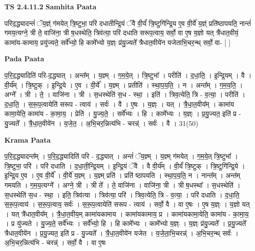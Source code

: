 \documentclass[17pt]{extarticle}
\begin{document}
\textbf{TS 2.4.11.2 } \newline
\textbf{Samhita Paata} \newline

परिद॒द्ध्यादन्तं॑ ॅय॒ज्ञ्ं ग॑मयेत् त्रि॒ष्टुभा॒ परि॑ दधातीन्द्रि॒यं ॅवै वी॒र्यं॑ त्रि॒ष्टुगि॑न्द्रि॒य ए॒व वी॒र्ये॑ य॒ज्ञ्ं प्रति॑ष्ठापयति॒ नान्तं॑ गमय॒त्यग्ने॒ त्री ते॒ वाजि॑ना॒ त्री ष॒धस्थेति॒ त्रिव॑त्या॒ परि॑ दधाति सरूप॒त्वाय॒ सर्वो॒ वा ए॒ष य॒ज्ञो यत् त्रै॑धात॒वीयं॒ कामा॑य-कामाय॒ प्रयु॑ज्यते॒ सर्वे᳚भ्यो॒ हि कामे᳚भ्यो य॒ज्ञ्ः प्र॑यु॒ज्यते᳚ त्रैधात॒वीये॑न यजेताभि॒चर॒न्थ् सर्वो॒ वा- [  ] \newline

\textbf{Pada Paata} \newline

प॒रि॒द॒द्ध्यादिति॑ परि-द॒द्ध्यात् । अन्त᳚म् । य॒ज्ञ्म् । ग॒म॒ये॒त् । त्रि॒ष्टुभा᳚ । परीति॑ । द॒धा॒ति॒ । इ॒न्द्रि॒यम् । वै । वी॒र्य᳚म् । त्रि॒ष्टुक् । इ॒न्द्रि॒ये । ए॒व । वी॒र्ये᳚ । य॒ज्ञ्म् । प्रतीति॑ । स्था॒प॒य॒ति॒ । न । अन्त᳚म् । ग॒म॒य॒ति॒ । अग्ने᳚ । त्री । ते॒ । वाजि॑ना । त्री । स॒धस्थेति॑ स॒ध - स्था॒ । इति॑ । त्रिव॒त्येति॒ त्रि - व॒त्या॒ । परीति॑ । द॒धा॒ति॒ । स॒रू॒प॒त्वायेति॑ सरूप - त्वाय॑ । सर्वः॑ । वै । ए॒षः । य॒ज्ञ्ः । यत् । त्रै॒धा॒त॒वीय᳚म् । कामा॑य कामा॒येति॒ कामा॑य - का॒मा॒य॒ । प्रेति॑ । यु॒ज्य॒ते॒ । सर्वे᳚भ्यः । हि । कामे᳚भ्यः । य॒ज्ञ्ः । प्र॒यु॒ज्यत॒ इति॑ प्र - यु॒ज्यते᳚ । त्रै॒धा॒त॒वीये॑न । य॒जे॒त॒ । अ॒भि॒चर॒न्नित्य॑भि - चरन्न्॑ । सर्वः॑ । वै । 31(50)  \newline


\textbf{Krama Paata} \newline

प॒रि॒द॒द्ध्यादन्त᳚म् । प॒रि॒द॒द्ध्यादिति॑ परि - द॒द्ध्यात् । अन्तं॑ ॅय॒ज्ञ्म् । य॒ज्ञ्म् ग॑मयेत् । ग॒म॒ये॒त् त्रि॒ष्टुभा᳚ । त्रि॒ष्टुभा॒ परि॑ । परि॑ दधाति । द॒धा॒ती॒न्द्रि॒यम् । इ॒न्द्रि॒यं ॅवै । वै वी॒र्य᳚म् । वी॒र्यं॑ त्रि॒ष्टुक् । त्रि॒ष्टुगि॑न्द्रि॒ये । इ॒न्द्रि॒य ए॒व । ए॒व वी॒र्ये᳚ । वी॒र्ये॑ य॒ज्ञ्म् । य॒ज्ञ्म् प्रति॑ । प्रति॑ ष्ठापयति । स्था॒प॒य॒ति॒ न । नान्त᳚म् । अन्त॑म् गमयति । ग॒म॒य॒त्यग्ने᳚ । अग्ने॒ त्री । त्री ते᳚ । ते॒ वाजि॑ना । वाजि॑ना॒ त्री । त्री ष॒धस्था᳚ । स॒धस्थेति॑ । स॒धस्थेति॑ स॒ध - स्था॒ । इति॒ त्रिव॑त्या । त्रिव॑त्या॒ परि॑ । त्रिव॒त्येति॒ त्रि - व॒त्या॒ । परि॑ दधाति । द॒धा॒ति॒ स॒रू॒प॒त्वाय॑ । स॒रू॒प॒त्वाय॒ सर्वः॑ । स॒रू॒प॒त्वायेति॑ सरूप - त्वाय॑ । सर्वो॒ वै । वा ए॒षः । ए॒ष य॒ज्ञ्ः । य॒ज्ञो यत् । यत् त्रै॑धात॒वीय᳚म् । त्रै॒धा॒त॒वीय॒म् कामा॑यकामाय । कामा॑यकामाय॒ प्र । कामा॑यकामा॒येति॒ कामा॑य - का॒मा॒य॒ । प्र यु॑ज्यते । यु॒ज्य॒ते॒ सर्वे᳚भ्यः । सर्वे᳚भ्यो॒ हि । हि कामे᳚भ्यः । कामे᳚भ्यो य॒ज्ञ्ः । य॒ज्ञ्ः प्र॑यु॒ज्यते᳚ । प्र॒यु॒ज्यते᳚ त्रैधात॒वीये॑न । प्र॒यु॒ज्यत॒ इति॑ प्र - यु॒ज्यते᳚ । त्रै॒धा॒त॒वीये॑न यजेत । य॒जे॒ता॒भि॒चरन्न्॑ । अ॒भि॒चर॒न्थ् सर्वः॑ । अ॒भि॒चर॒न्नित्य॑भि - चरन्न्॑ । सर्वो॒ वै । वा ए॒षः \newline
\end{document}
